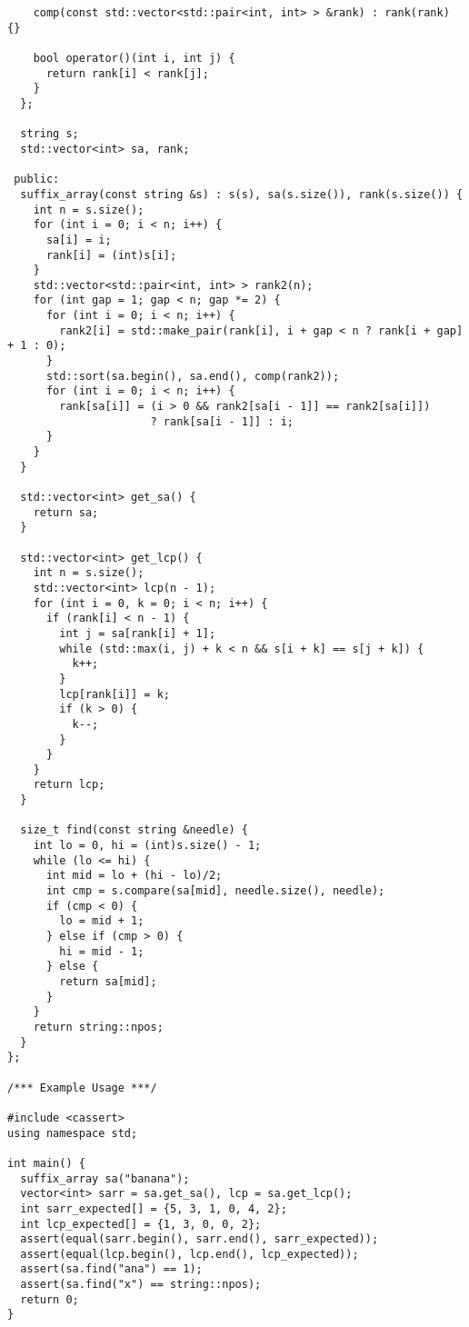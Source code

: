 \begin{lstlisting}
    comp(const std::vector<std::pair<int, int> > &rank) : rank(rank) {}

    bool operator()(int i, int j) {
      return rank[i] < rank[j];
    }
  };

  string s;
  std::vector<int> sa, rank;

 public:
  suffix_array(const string &s) : s(s), sa(s.size()), rank(s.size()) {
    int n = s.size();
    for (int i = 0; i < n; i++) {
      sa[i] = i;
      rank[i] = (int)s[i];
    }
    std::vector<std::pair<int, int> > rank2(n);
    for (int gap = 1; gap < n; gap *= 2) {
      for (int i = 0; i < n; i++) {
        rank2[i] = std::make_pair(rank[i], i + gap < n ? rank[i + gap] + 1 : 0);
      }
      std::sort(sa.begin(), sa.end(), comp(rank2));
      for (int i = 0; i < n; i++) {
        rank[sa[i]] = (i > 0 && rank2[sa[i - 1]] == rank2[sa[i]])
                      ? rank[sa[i - 1]] : i;
      }
    }
  }

  std::vector<int> get_sa() {
    return sa;
  }

  std::vector<int> get_lcp() {
    int n = s.size();
    std::vector<int> lcp(n - 1);
    for (int i = 0, k = 0; i < n; i++) {
      if (rank[i] < n - 1) {
        int j = sa[rank[i] + 1];
        while (std::max(i, j) + k < n && s[i + k] == s[j + k]) {
          k++;
        }
        lcp[rank[i]] = k;
        if (k > 0) {
          k--;
        }
      }
    }
    return lcp;
  }

  size_t find(const string &needle) {
    int lo = 0, hi = (int)s.size() - 1;
    while (lo <= hi) {
      int mid = lo + (hi - lo)/2;
      int cmp = s.compare(sa[mid], needle.size(), needle);
      if (cmp < 0) {
        lo = mid + 1;
      } else if (cmp > 0) {
        hi = mid - 1;
      } else {
        return sa[mid];
      }
    }
    return string::npos;
  }
};

/*** Example Usage ***/

#include <cassert>
using namespace std;

int main() {
  suffix_array sa("banana");
  vector<int> sarr = sa.get_sa(), lcp = sa.get_lcp();
  int sarr_expected[] = {5, 3, 1, 0, 4, 2};
  int lcp_expected[] = {1, 3, 0, 0, 2};
  assert(equal(sarr.begin(), sarr.end(), sarr_expected));
  assert(equal(lcp.begin(), lcp.end(), lcp_expected));
  assert(sa.find("ana") == 1);
  assert(sa.find("x") == string::npos);
  return 0;
}
\end{lstlisting}
